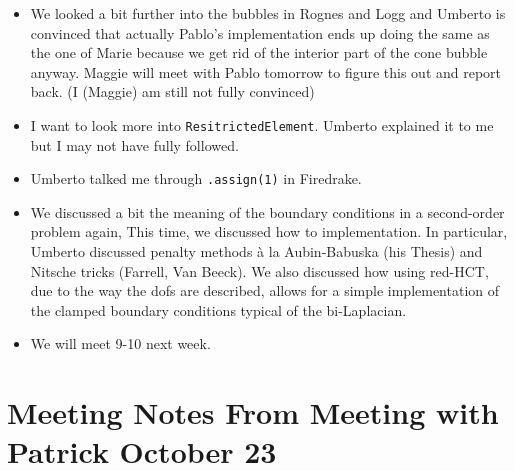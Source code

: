 \documentclass[12pt,a4paper]{article}
\begin{document}
\begin{itemize}

\item We looked a bit further into the bubbles in Rognes and Logg and Umberto is convinced that actually Pablo's implementation ends up doing the same as the one of Marie because we get rid of the interior part of the cone bubble anyway. Maggie will meet with Pablo tomorrow to figure this out and report back. (I (Maggie) am still not fully convinced)

\item I want to look more into \texttt{ResitrictedElement}. Umberto explained it to me but I may not have fully followed. 

\item Umberto talked me through \texttt{.assign(1)} in Firedrake. 

\item We discussed a bit the meaning of the boundary conditions in a second-order problem  again, This time, we discussed how to implementation. In particular, Umberto discussed penalty methods à la Aubin-Babuska (his Thesis) and Nitsche tricks (Farrell, Van Beeck). We also discussed how using red-HCT, due to the way the dofs are described, allows for a simple implementation of the clamped boundary conditions typical of the bi-Laplacian.

\item We will meet 9-10 next week. 

\end{itemize}

\section{Meeting Notes From Meeting with Patrick October 23}
\end{document}
